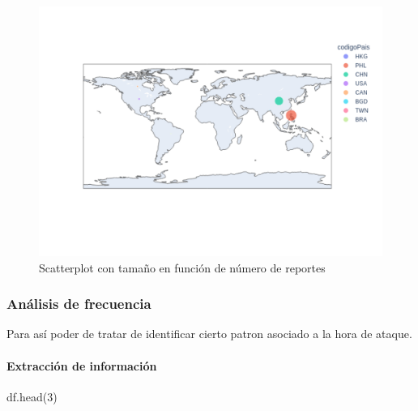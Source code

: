 \documentclass[
  letterpaper,
  DIV=11,
  numbers=noendperiod]{scrartcl}
\let\oldparagraph\paragraph
\renewcommand{\paragraph}[1]{\oldparagraph{#1}\mbox{}}
\newenvironment{Shaded}{\begin{snugshade}}{\end{snugshade}}
\newcommand{\DecValTok}[1]{\textcolor[rgb]{0.68,0.00,0.00}{#1}}
\newcommand{\NormalTok}[1]{\textcolor[rgb]{0.00,0.23,0.31}{#1}}
\begin{document}
\begin{figure}[H]

{\centering \includegraphics{Análisis_files/figure-pdf/fig-scatergeoddos-output-1.png}

}

\caption{\label{fig-scatergeoddos}Scatterplot con tamaño en función de
número de reportes}

\end{figure}

\hypertarget{anuxe1lisis-de-frecuencia-1}{%
\subsubsection{Análisis de
frecuencia}\label{anuxe1lisis-de-frecuencia-1}}

Para así poder de tratar de identificar cierto patron asociado a la hora
de ataque.

\hypertarget{extracciuxf3n-de-informaciuxf3n-2}{%
\paragraph{Extracción de
información}\label{extracciuxf3n-de-informaciuxf3n-2}}

\begin{Shaded}
\begin{Highlighting}[]
\NormalTok{df.head(}\DecValTok{3}\NormalTok{)}
\end{Highlighting}
\end{Shaded}
\end{document}
